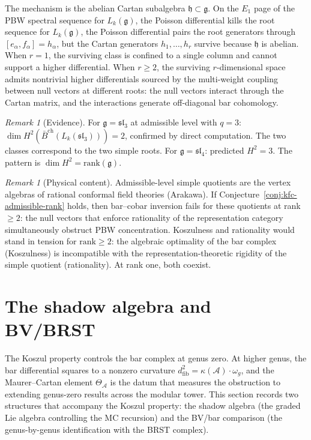 \documentclass[11pt,reqno]{amsart}
\theoremstyle{definition}
\theoremstyle{remark}
\newtheorem{remark}[theorem]{Remark}
\newcommand{\cA}{\mathcal{A}}
\newcommand{\barBch}{\bar{B}^{\mathrm{ch}}}
\newcommand{\fg}{\mathfrak{g}}
\newcommand{\fh}{\mathfrak{h}}
\numberwithin{equation}{section}
\begin{document}
The mechanism is the abelian Cartan subalgebra
$\fh \subset \fg$. On the $E_1$ page of the PBW spectral
sequence for $L_k(\fg)$, the Poisson differential kills the root
sequence for $L_k(\fg)$, the Poisson differential pairs the root
generators through $[e_\alpha, f_\alpha] = h_\alpha$, but the
Cartan generators $h_1, \ldots, h_r$ survive because $\fh$ is
abelian. When $r = 1$, the surviving class is confined to a
single column and cannot support a higher differential. When
$r \geq 2$, the surviving $r$-dimensional space admits
nontrivial higher differentials sourced by the multi-weight
coupling between null vectors at different roots: the null
vectors interact through the Cartan matrix, and the
interactions generate off-diagonal bar cohomology.

\begin{remark}[Evidence]
\label{rem:kfc-admissible-evidence}
For $\fg = \mathfrak{sl}_3$ at admissible level with $q = 3$:
$\dim H^2(\barBch(L_k(\mathfrak{sl}_3))) = 2$, confirmed by
direct computation. The two classes correspond to the two simple
roots. For $\fg = \mathfrak{sl}_4$: predicted $H^2 = 3$.
The pattern is $\dim H^2 = \mathrm{rank}(\fg)$.
\end{remark}

\begin{remark}[Physical content]
\label{rem:kfc-admissible-physical}
Admissible-level simple quotients are the vertex algebras of
rational conformal field theories (Arakawa). If
Conjecture~\ref{conj:kfc-admissible-rank} holds, then
bar--cobar inversion fails for these quotients at rank
$\geq 2$: the null vectors that enforce rationality of the
representation category simultaneously obstruct PBW
concentration. Koszulness and rationality would stand in
tension for $\mathrm{rank} \geq 2$: the algebraic optimality
of the bar complex (Koszulness) is incompatible with the
representation-theoretic rigidity of the simple quotient
(rationality). At rank one, both coexist.
\end{remark}


\section{The shadow algebra and BV/BRST}
\label{sec:shadow-bv}

The Koszul property controls the bar complex at genus zero. At
higher genus, the bar differential squares to a nonzero
curvature $d^2_{\mathrm{fib}} = \kappa(\cA) \cdot \omega_g$, and
the Maurer--Cartan element $\Theta_\cA$ is the datum that
measures the obstruction to extending genus-zero
results across the modular tower. This section records two
structures that accompany the Koszul property: the shadow
algebra (the graded Lie algebra controlling the MC recursion)
and the BV/bar comparison (the genus-by-genus identification
with the BRST complex).
\end{document}
